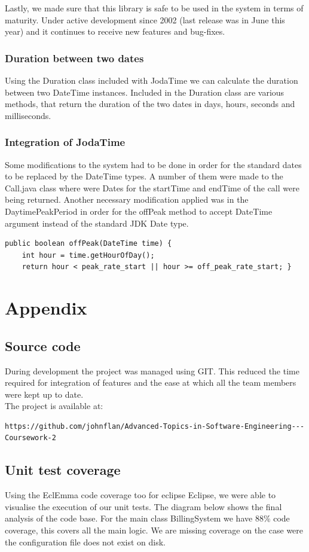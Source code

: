 \documentclass[pdftex,11pt,a4paper]{article}
\begin{document}
Lastly, we made sure that this library is safe to be used in the system in terms of maturity. Under active development since 2002 (last release was in June this year) and it continues to receive new features and bug-fixes.

\subsubsection{Duration between two dates}
Using the Duration class included with JodaTime we can calculate the duration between two DateTime instances. Included in the Duration class are various methods, that return the duration of the two dates in days, hours, seconds and milliseconds.

\subsubsection{Integration of JodaTime}
Some modifications to the system had to be done in order for the standard dates to be replaced by the DateTime types. A number of them were made to the Call.java class where were Dates for the startTime and endTime of the call were being returned. Another necessary modification applied was in the DaytimePeakPeriod in order for the offPeak method to accept DateTime argument instead of the standard JDK Date type.
\begin{lstlisting}
public boolean offPeak(DateTime time) {     
	int hour = time.getHourOfDay();
	return hour < peak_rate_start || hour >= off_peak_rate_start; }
\end{lstlisting}
\newpage
\section{Appendix}

\subsection{Source code}
During development the project was managed using GIT. This reduced the time required for integration of features and the ease at which all the team members were kept up to date.\\
The project is available at:
\begin{lstlisting}
https://github.com/johnflan/Advanced-Topics-in-Software-Engineering---Coursework-2
\end{lstlisting}

\subsection{Unit test coverage}
Using the EclEmma code coverage too for eclipse Eclipse, we were able to visualise the execution of our unit tests. The diagram below shows the final analysis of the code base. For the main class BillingSystem we have 88\% code coverage, this covers all the main logic. We are missing coverage on the case were the configuration file does not exist on disk.
\end{document}
